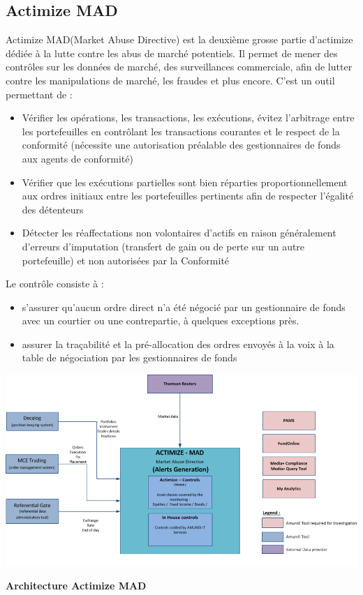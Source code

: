 \documentclass[12pt,a4paper]{report}
\begin{document}
\subsection{Actimize MAD}
Actimize MAD(Market Abuse Directive) est la deuxième grosse partie d'actimize dédiée à la lutte contre les abus de marché potentiels. Il permet de mener des contrôles sur les données de marché, des surveillances commerciale, afin de lutter contre les manipulations de marché, les fraudes et plus encore.
C'est un outil permettant de :
\begin{itemize}
\item Vérifier les opérations, les transactions, les exécutions, évitez l'arbitrage entre les portefeuilles en contrôlant les transactions courantes et le respect de la conformité (nécessite une autorisation préalable des gestionnaires de fonds aux agents de conformité)
\item Vérifier que les exécutions partielles sont bien réparties proportionnellement aux ordres initiaux entre les portefeuilles pertinents afin de respecter l'égalité des détenteurs
\item Détecter les réaffectations non volontaires d'actifs en raison généralement d'erreurs d'imputation (transfert de gain ou de perte sur un autre portefeuille) et non autorisées par la Conformité
\end{itemize}
\newpage Le contrôle consiste à :
\begin{itemize}
\item s'assurer qu'aucun ordre direct n'a été négocié par un gestionnaire de fonds avec un courtier ou une contrepartie, à quelques exceptions près.

\item assurer la traçabilité et la pré-allocation des ordres envoyés à la voix à la table de négociation par les gestionnaires de fonds
\end{itemize}
\vspace{0.6cm}
\includegraphics[scale=1]{IMG/mad.png} 
\begin{center}
\textbf{Architecture Actimize MAD}
\end{center}
\end{document}
